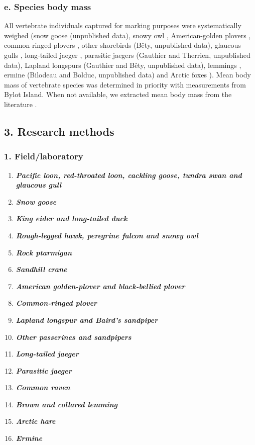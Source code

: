 \documentclass[a4paper,twoside,10pt]{article}
\begin{document}
\subsubsection*{e. Species body mass}
All vertebrate individuals captured for marking purposes were systematically weighed (snow goose (unpublished data), snowy owl \citep{therrien2012, robillard2018}, American-golden plovers \citep{lamarre2021},  common-ringed plovers \citep{leandri2019}, other shorebirds (Bêty, unpublished data), glaucous gulls \citep{gauthier2015}, long-tailed jaeger \citep{seyer2019}, parasitic jaegers (Gauthier and Therrien, unpublished data), Lapland longspurs (Gauthier and Bêty, unpublished data), lemmings \citep{gauthier2020lemmings}, ermine (Bilodeau and Bolduc, unpublished data) and Arctic foxes \citep{lai2015}). Mean body mass of vertebrate species was determined in priority with measurements from Bylot Island. When not available, we extracted mean body mass from the literature \citep{wilman2014}.
\newpage
        		

            
    \subsection*{3.  Research methods}
    		\subsubsection*{1. Field/laboratory}
    		\begin{enumerate}[label=\alph*.]
        			\item[] \textit{\textbf{Pacific loon, red-throated loon, cackling goose, tundra swan and glaucous
gull}}
        			\item[] \textit{\textbf{Snow goose}}
        			\item[] \textit{\textbf{King eider and long-tailed duck}}
        			\item[] \textit{\textbf{Rough-legged hawk, peregrine falcon and snowy owl}} 
        			\item[] \textit{\textbf{Rock ptarmigan}}
        			\item[] \textit{\textbf{Sandhill crane}}
        			\item[] \textit{\textbf{American golden-plover and black-bellied plover}}
        			\item[] \textit{\textbf{Common-ringed plover}}
        			\item[] \textit{\textbf{Lapland longspur and Baird’s sandpiper}}
        			\item[] \textit{\textbf{Other passerines and sandpipers}}
        			\item[] \textit{\textbf{Long-tailed jaeger}}
        			\item[] \textit{\textbf{Parasitic jaeger}}
        			\item[] \textit{\textbf{Common raven}}
        			\item[] \textit{\textbf{Brown and collared lemming}}
        			\item[] \textit{\textbf{Arctic hare}}
        			\item[] \textit{\textbf{Ermine}}
        		\end{enumerate}
        		
\end{document}
